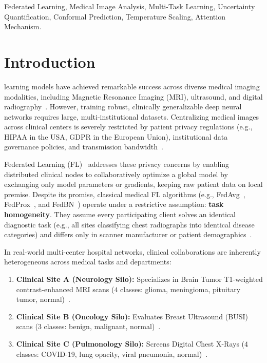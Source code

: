 \documentclass[journal]{IEEEtran}
\begin{document}
\begin{IEEEkeywords}
Federated Learning, Medical Image Analysis, Multi-Task Learning, Uncertainty Quantification, Conformal Prediction, Temperature Scaling, Attention Mechanism.
\end{IEEEkeywords}

\section{Introduction}
 learning models have achieved remarkable success across diverse medical imaging modalities, including Magnetic Resonance Imaging (MRI), ultrasound, and digital radiography~\cite{litjens2017survey,esteva2019guide}. However, training robust, clinically generalizable deep neural networks requires large, multi-institutional datasets. Centralizing medical images across clinical centers is severely restricted by patient privacy regulations (e.g., HIPAA in the USA, GDPR in the European Union), institutional data governance policies, and transmission bandwidth~\cite{rieke2020future}.

Federated Learning (FL)~\cite{mcmahan2017communication,kairouz2021advances} addresses these privacy concerns by enabling distributed clinical nodes to collaboratively optimize a global model by exchanging only model parameters or gradients, keeping raw patient data on local premise. Despite its promise, classical medical FL algorithms (e.g., FedAvg~\cite{mcmahan2017communication}, FedProx~\cite{li2020federated}, and FedBN~\cite{li2021fedbn}) operate under a restrictive assumption: \textbf{task homogeneity}. They assume every participating client solves an identical diagnostic task (e.g., all sites classifying chest radiographs into identical disease categories) and differs only in scanner manufacturer or patient demographics~\cite{yang2019federated}.

In real-world multi-center hospital networks, clinical collaborations are inherently heterogeneous across medical tasks and departments:
\begin{enumerate}
    \item \textbf{Clinical Site A (Neurology Silo):} Specializes in Brain Tumor T1-weighted contrast-enhanced MRI scans ($4$ classes: glioma, meningioma, pituitary tumor, normal)~\cite{cheng2015enhanced}.
    \item \textbf{Clinical Site B (Oncology Silo):} Evaluates Breast Ultrasound (BUSI) scans ($3$ classes: benign, malignant, normal)~\cite{al2020dataset}.
    \item \textbf{Clinical Site C (Pulmonology Silo):} Screens Digital Chest X-Rays ($4$ classes: COVID-19, lung opacity, viral pneumonia, normal)~\cite{chowdhury2020can}.
\end{enumerate}
\end{document}
